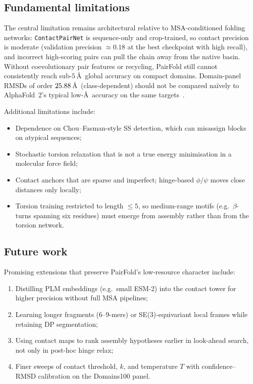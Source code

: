 \documentclass[11pt,a4paper]{article}
\begin{document}
\subsection{Fundamental limitations}

The central limitation remains architectural relative to MSA-conditioned folding networks:
\texttt{ContactPairNet} is sequence-only and crop-trained, so contact precision is moderate (validation precision $\approx 0.18$ at the best checkpoint with high recall), and incorrect high-scoring pairs can pull the chain away from the native basin.
Without coevolutionary pair features or recycling, PairFold still cannot consistently reach sub-$5$\,\AA\ global accuracy on compact domains.
Domain-panel RMSDs of order $25.88{}$\,\AA\ (class-dependent) should not be compared na\"ively to AlphaFold~2's typical low-\AA\ accuracy on the same targets~\citep{jumper2021alphafold}.

Additional limitations include:
\begin{itemize}[leftmargin=1.5em]
  \item Dependence on Chou--Fasman-style SS detection, which can misassign blocks on atypical sequences;
  \item Stochastic torsion relaxation that is not a true energy minimisation in a molecular force field;
  \item Contact anchors that are sparse and imperfect; hinge-based $\phi/\psi$ moves close distances only locally;
  \item Torsion training restricted to length $\le 5$, so medium-range motifs (e.g.\ $\beta$-turns spanning six residues) must emerge from assembly rather than from the torsion network.
\end{itemize}

\subsection{Future work}

Promising extensions that preserve PairFold's low-resource character include:
\begin{enumerate}[leftmargin=1.5em]
  \item Distilling PLM embeddings (e.g.\ small ESM-2) into the contact tower for higher precision without full MSA pipelines;
  \item Learning longer fragments ($6$--$9$-mers) or SE(3)-equivariant local frames while retaining DP segmentation;
  \item Using contact maps to rank assembly hypotheses earlier in look-ahead search, not only in post-hoc hinge relax;
  \item Finer sweeps of contact threshold, $k$, and temperature $T$ with confidence--RMSD calibration on the Domains100 panel.
\end{enumerate}
\end{document}
